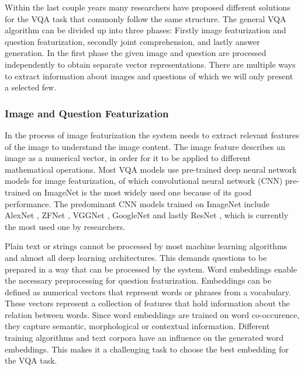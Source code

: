 \documentclass{article}
\begin{document}
Within the last couple years many researchers have proposed different solutions for the VQA task that commonly follow the same structure. The general VQA algorithm can be divided up into three phases: Firstly image featurization and question featurization, secondly joint comprehension, and lastly answer generation.
In the first phase the given image and question are processed independently to obtain separate vector representations. There are multiple ways to extract information about images and questions of which we will only present a selected few.

\subsubsection{Image and Question Featurization}

In the process of image featurization the system needs to extract relevant features of the image to understand the image content. The image feature describes an image as a numerical vector, in order for it to be applied to different mathematical operations. Most VQA models use pre-trained deep neural network models for image featurization, of which convolutional neural network (CNN) \citep{krizhevsky2012imagenet} pre-trained on ImageNet \citep{russakovsky2015imagenet} is the most widely used one because of its good performance. The predominant CNN models trained on ImageNet include AlexNet \citep{krizhevsky2012imagenet}, ZFNet \citep{zeiler2014visual}, VGGNet \citep{simonyan2015very}, GoogleNet \citep{szegedy2015going} and lastly ResNet \citep{residual}, which is currently the most used one by researchers.

Plain text or strings cannot be processed by most machine learning algorithms and almost all deep learning architectures. This demands questions to be prepared in a way that can be processed by the system. Word embeddings enable the necessary preprocessing for question featurization. Embeddings can be defined as numerical vectors that represent words or phrases from a vocabulary. These vectors represent a collection of features that hold information about the relation between words. Since word embeddings are trained on word co-occurence, they capture semantic, morphological or contextual information. Different training algorithms and text corpora have an influence on the generated word embeddings. This makes it a challenging task to choose the best embedding for the VQA task.
\end{document}
